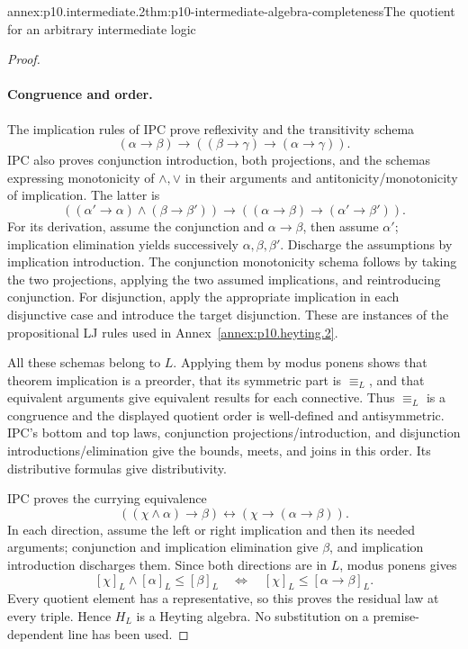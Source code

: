 \begin{annexitem}{annex:p10.intermediate.2}{thm:p10-intermediate-algebra-completeness}{The quotient for an arbitrary intermediate logic}
\begin{proof}
\paragraph{Congruence and order.}
The implication rules of IPC prove reflexivity and the transitivity
schema
\[
 (\alpha\to\beta)\to((\beta\to\gamma)\to(\alpha\to\gamma)).
\]
IPC also proves conjunction introduction, both projections, and the
schemas expressing monotonicity of \(\wedge,\vee\) in their arguments
and antitonicity/monotonicity of implication.  The latter is
\[
 ((\alpha'\to\alpha)\wedge(\beta\to\beta'))
       \to((\alpha\to\beta)\to(\alpha'\to\beta')).
\]
For its derivation, assume the conjunction and \(\alpha\to\beta\),
then assume \(\alpha'\); implication elimination yields successively
\(\alpha,\beta,\beta'\).  Discharge the assumptions by implication
introduction.  The conjunction monotonicity schema follows by taking
the two projections, applying the two assumed implications, and
reintroducing conjunction.  For disjunction, apply the appropriate
implication in each disjunctive case and introduce the target disjunction.
These are instances of the propositional LJ rules used in
Annex~\ref{annex:p10.heyting.2}.

All these schemas belong to \(L\).  Applying them by modus ponens
shows that theorem implication is a preorder, that its symmetric part
is \(\equiv_L\), and that equivalent arguments give equivalent results
for each connective.  Thus \(\equiv_L\) is a congruence and the
displayed quotient order is well-defined and antisymmetric.
IPC's bottom and top laws, conjunction projections/introduction, and
disjunction introductions/elimination give the bounds, meets, and
joins in this order.  Its distributive formulas give distributivity.

IPC proves the currying equivalence
\[
 ((\chi\wedge\alpha)\to\beta)
       \leftrightarrow(\chi\to(\alpha\to\beta)).
\]
In each direction, assume the left or right implication and then its
needed arguments; conjunction and implication elimination give
\(\beta\), and implication introduction discharges them.
Since both directions are in \(L\), modus ponens gives
\[
 [\chi]_L\wedge[\alpha]_L\leq[\beta]_L
       \quad\Longleftrightarrow\quad
 [\chi]_L\leq[\alpha\to\beta]_L.
\]
Every quotient element has a representative, so this proves the
residual law at every triple.  Hence \(H_L\) is a Heyting algebra.
No substitution on a premise-dependent line has been used.


\end{proof}
\end{annexitem}
